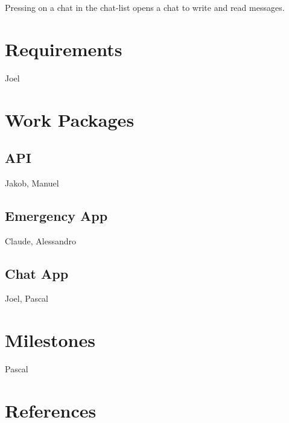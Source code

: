 \documentclass{report}
\begin{document}
			Pressing on a chat in the chat-list opens a chat to write and read messages.\\
			
	
	\section{Requirements}
		Joel
	
	\section{Work Packages}
	
		\subsection{API}
			Jakob, Manuel
		
		\subsection{Emergency App}
			Claude, Alessandro
		
		\subsection{Chat App}
			Joel, Pascal
	
	\section{Milestones}
		Pascal
	
	\section{References}
	
	
	
	
\end{document}
